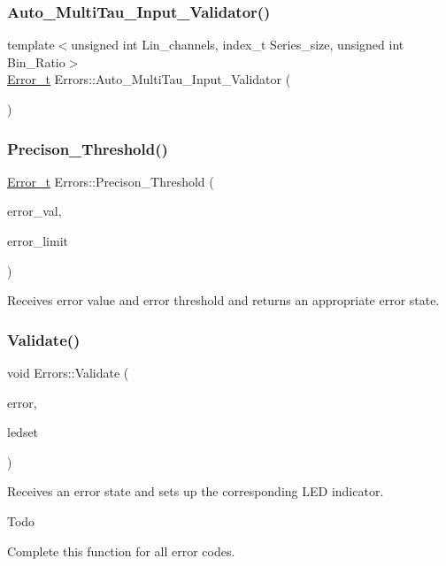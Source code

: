\subsubsection{\texorpdfstring{Auto\+\_\+\+Multi\+Tau\+\_\+\+Input\+\_\+\+Validator()}{Auto\_MultiTau\_Input\_Validator()}}
{\footnotesize\ttfamily template$<$unsigned int Lin\+\_\+channels, index\+\_\+t Series\+\_\+size, unsigned int Bin\+\_\+\+Ratio$>$ \\
\hyperlink{errors_8hpp_a4e8c0d09726859e3d3369c0da5a1aa7f}{Error\+\_\+t} Errors\+::\+Auto\+\_\+\+Multi\+Tau\+\_\+\+Input\+\_\+\+Validator (\begin{DoxyParamCaption}{ }\end{DoxyParamCaption})}

\mbox{\label{namespaceErrors_a13171d3d324164c9f7a9508d5a16b0c5}} 
\subsubsection{\texorpdfstring{Precison\+\_\+\+Threshold()}{Precison\_Threshold()}}
{\footnotesize\ttfamily \hyperlink{errors_8hpp_a4e8c0d09726859e3d3369c0da5a1aa7f}{Error\+\_\+t} Errors\+::\+Precison\+\_\+\+Threshold (\begin{DoxyParamCaption}\item[{double}]{error\+\_\+val,  }\item[{double}]{error\+\_\+limit }\end{DoxyParamCaption})}



Receives error value and error threshold and returns an appropriate error state. 

\mbox{\label{namespaceErrors_a8f082a1fb43d231480a51452d20a60ad}} 
\subsubsection{\texorpdfstring{Validate()}{Validate()}}
{\footnotesize\ttfamily void Errors\+::\+Validate (\begin{DoxyParamCaption}\item[{const \hyperlink{errors_8hpp_a4e8c0d09726859e3d3369c0da5a1aa7f}{Error\+\_\+t}}]{error,  }\item[{const \hyperlink{classLEDSet}{L\+E\+D\+Set} \&}]{ledset }\end{DoxyParamCaption})}



Receives an error state and sets up the corresponding L\+ED indicator. 

\begin{DoxyRefDesc}{Todo}
\item[\hyperlink{todo__todo000001}{Todo}]Complete this function for all error codes. \end{DoxyRefDesc}
